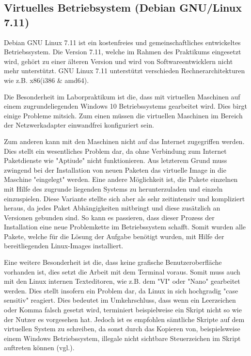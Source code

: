 \documentclass[
a4paper,     %
 headsepline, %
footsepline, %
titlepage,   %
 halfparskip,     %
 fleqn,       %
12pt         %
]{scrartcl}  %
\begin{document}
\subsection{Virtuelles Betriebsystem (Debian GNU/Linux 7.11) }\label{Linux}
Debian GNU Linux 7.11 ist ein kostenfreies und gemeinschaftliches entwickeltes Betriebssystem. Die Version 7.11, welche im Rahmen des Praktikums eingesetzt wird, gehört zu einer älteren Version und wird von Softwareentwicklern nicht mehr unterstützt. GNU Linux 7.11 unterstützt verschieden Rechnerarchitekturen wie z.B. x86(i386 \& amd64). 

Die Besonderheit im Laborpraktikum ist die, dass mit virtuellen Maschinen auf einem zugrundeliegenden Windows 10 Betriebssystems gearbeitet wird. Dies birgt einige Probleme mitsich. Zum einen müssen die virtuellen Maschinen im Bereich der Netzwerkadapter einwandfrei konfiguriert sein.

Zum anderen kann mit den Maschinen nicht auf das Internet zugegriffen werden. Dies stellt ein wesentliches Problem dar, da ohne Verbindung zum Internet Paketdienste wie "Aptiude" nicht funktionieren. Aus letzterem Grund muss zwingend bei der Installation von neuen Paketen das virtuelle Image in die Maschine "eingelegt" werden. Eine andere Möglichkeit ist, die Pakete einzelnen mit Hilfe des zugrunde liegenden Systems zu herunterzuladen und einzeln einzuspielen. Diese Variante stellte sich aber als sehr zeitintensiv und kompliziert heraus, da jedes Paket Abhängigkeiten mitbringt und diese zusätzlich an Versionen gebunden sind. So kann es passieren, dass dieser Prozess der Installation eine neue Problemkette im Betriebssystem schafft. Somit wurden alle Pakete, welche für die Lösung der Aufgabe benötigt wurden, mit Hilfe der bereitliegenden Linux-Images installiert.  

Eine weitere Besonderheit ist die, dass keine grafische Benutzeroberfläche vorhanden ist, dies setzt die Arbeit mit dem Terminal voraus.  Somit muss auch mit den Linux internen Texteditoren, wie z.B. dem "VI" oder "Nano" gearbeitet werden. Dies stellt insofern ein Problem dar, da Linux in sich hochgradig "case sensitiv" reagiert. Dies bedeutet im Umkehrschluss, dass wenn ein Leerzeichen oder Komma falsch gesetzt wird, terminiert beispielweise ein Skript nicht so wie der Nutzer es vorgesehen hat. Jedoch ist es empfohlen sämtliche Skripte auf dem virtuellen System zu schreiben, da sonst durch das Kopieren von, beispielsweise einem Windows Betriebssystem, illegale nicht sichtbare Steuerzeichen im Skript auftreten können (vgl.\cite{editoren-3}). 
\end{document}
